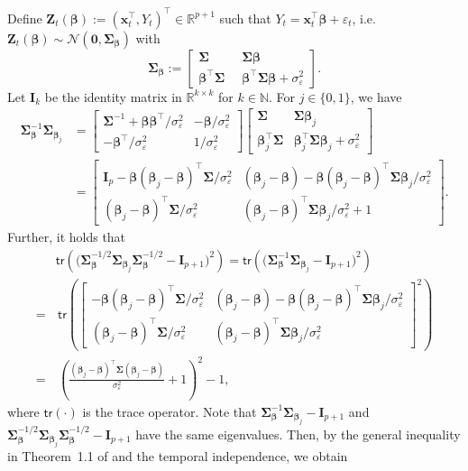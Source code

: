 \documentclass[11pt, a4paper]{article}
\newcommand{\mbf}{\mathbf}
\newcommand{\bmx}{\begin{bmatrix}}
\newcommand{\emx}{\end{bmatrix}}
\newcommand{\vep}{\varepsilon}
\renewcommand{\l}{\left}
\renewcommand{\r}{\right}
\newcommand{\tr}[0]{\mathsf{tr}}
\newcommand{\R}{\mathbb{R}}
\newcommand{\N}{\mathbb{N}}
\theoremstyle{definition}
\theoremstyle{definition}
\theoremstyle{definition}
\theoremstyle{definition}
\theoremstyle{definition}
\theoremstyle{remark}
\theoremstyle{definition}
\theoremstyle{definition}
\theoremstyle{definition}
\begin{document}
Define $\mbf Z_t({\bm \beta}):= (\mbf x_t^\top, Y_t)^\top \in \R^{p+1}$ such that $Y_t = \mbf x_t^\top {\bm\beta} + \vep_t$, i.e.\ $\mbf Z_t({\bm \beta}) \sim \mathcal{N}(\bm 0, \bm \Sigma_{{\bm\beta}})$ with 
$$
\bm \Sigma_{{\bm\beta}} := 
\bmx
\bm\Sigma &\;\; \bm\Sigma {\bm\beta}\\
{\bm\beta}^\top\bm\Sigma & \;\;{\bm\beta}^\top \bm\Sigma {\bm\beta} + \sigma_{\vep}^2
\emx.
$$
Let $\mbf I_k$ be the identity matrix in $\R^{k \times k}$ for $k\in\N$. For $j \in \{0,1\}$, we have 
\begin{align*}
\bm\Sigma_{\bm\beta}^{-1} \bm\Sigma_{\bm\beta_j} & = 
\bmx
\bm\Sigma^{-1} + \bm\beta\bm\beta^\top/\sigma_{\vep}^2 & -\bm\beta/\sigma_{\vep}^2\\
-\bm\beta^\top/\sigma_{\vep}^2& 1/\sigma_{\vep}^2
\emx
\bmx
\bm\Sigma & \bm\Sigma {\bm\beta}_j\\
{\bm\beta}_j^\top\bm\Sigma & {\bm\beta}_j^\top\bm\Sigma {\bm\beta}_j + \sigma_{\vep}^2
\emx \\
& =
\bmx
\mbf I_p - \bm\beta(\bm\beta_j - \bm\beta)^\top\bm\Sigma/\sigma_{\vep}^2 & 
(\bm\beta_j - \bm\beta) - \bm\beta(\bm\beta_j - \bm\beta)^\top\bm\Sigma{\bm\beta}_j/\sigma_{\vep}^2\\
({\bm\beta}_j - \bm\beta)^\top\bm\Sigma/\sigma_{\vep}^2 & (\bm\beta_j - \bm\beta)^\top\bm\Sigma{\bm\beta}_j/\sigma_{\vep}^2 + 1
\emx.
\end{align*}
Further, it holds that
\begin{align*}
& \tr\l(\bigl(\bm\Sigma_{\bm\beta}^{-1/2} \bm\Sigma_{\bm\beta_j} \bm\Sigma_{\bm\beta}^{-1/2} - \mbf I_{p+1}\bigr)^2\r) = \tr\l(\bigl(\bm\Sigma_{\bm\beta}^{-1} \bm\Sigma_{\bm\beta_j} - \mbf I_{p+1}\bigr)^2\r)\\
= & \, \tr\l(
\bmx
- \bm\beta(\bm\beta_j - \bm\beta)^\top\bm\Sigma/\sigma_{\vep}^2 & 
(\bm\beta_j - \bm\beta) - \bm\beta(\bm\beta_j - \bm\beta)^\top\bm\Sigma{\bm\beta}_j/\sigma_{\vep}^2\\
({\bm\beta}_j - \bm\beta)^\top\bm\Sigma/\sigma_{\vep}^2 & (\bm\beta_j - \bm\beta)^\top\bm\Sigma{\bm\beta}_j/\sigma_{\vep}^2
\emx^2\r)\\
= & \, \l(\frac{(\bm\beta_j - \bm\beta)^\top \bm\Sigma(\bm\beta_j - \bm\beta)}{\sigma_{\vep}^2} + 1\r)^2 - 1,
\end{align*}
where $\tr(\cdot)$ is the trace operator. Note that $\bm\Sigma_{\bm\beta}^{-1} \bm\Sigma_{\bm\beta_j} - \mbf I_{p+1}$ and $\bm\Sigma_{\bm\beta}^{-1/2} \bm\Sigma_{\bm\beta_j} \bm\Sigma_{\bm\beta}^{-1/2} - \mbf I_{p+1}$ have the same eigenvalues. Then, by the general inequality in Theorem~1.1 of \citet{devroye2018total} and the temporal independence, we obtain
\end{document}
